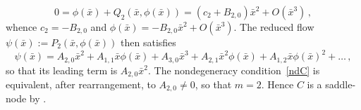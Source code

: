 \documentclass[reqno,11pt]{amsart}
\numberwithin{equation}{section}
\begin{document}
\begin{appendix}
\begin{equation*}
0 = \phi(\bar{x}) + Q_2 (\bar{x}, \phi(\bar{x})) = (c_2 +B_{2,0}) \bar{x}^2 + O(\bar{x}^3)\,,
\end{equation*}
whence $c_2 = - B_{2,0}$ and $\phi(\bar{x}) =- B_{2,0} \bar{x}^2 + O(\bar{x}^3)$. The reduced flow $\psi(\bar{x}):= P_2 (\bar{x}, \phi(\bar{x}))$ then satisfies
\begin{equation*}
\psi(\bar{x}) = A_{2,0} \bar{x}^2 + A_{1,1}  \bar{x} \phi(\bar{x}) + A_{3,0}  \bar{x}^3 + A_{2,1} \bar{x}^2 \phi(\bar{x}) + A_{1,2} \bar{x} \phi(\bar{x})^2 + \dotsc\,,
\end{equation*}
so that its leading term is $A_{2,0} \bar{x}^2$. The nondegeneracy condition~\eqref{ndC} is equivalent, after rearrangement, to $A_{2,0}\neq 0$, so that $m=2$. Hence $C$ is a saddle-node by \cite[Thm.~1, Sec.~2.11]{Pe01}.\\


\end{appendix}
\end{document}
